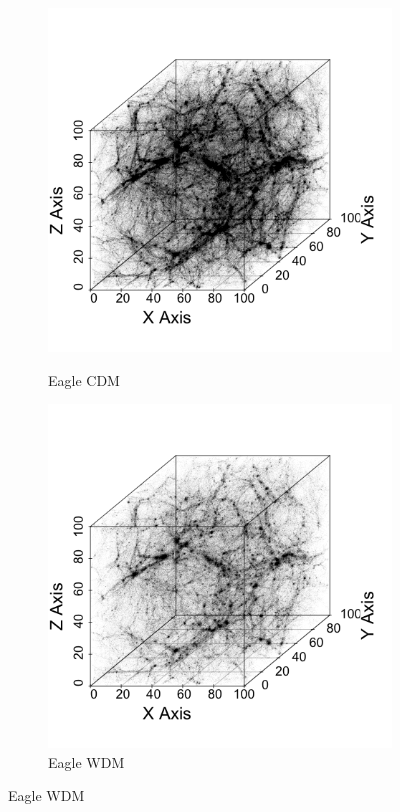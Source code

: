 \documentclass[12pt]{article}
\begin{document}
\begin{figure}[htp!]
  \centering
  \begin{subfigure}{0.24\textwidth}
    \caption{Eagle CDM}
    \includegraphics[width=\linewidth]{figure_11_cdm_plot.png}
    \label{fig:eagleDiagsA}
  \end{subfigure}
  \begin{subfigure}{0.24\textwidth}
    \caption{Eagle WDM}
    \includegraphics[width=\linewidth]{figure_11_wdm_plot.png}

\end{subfigure}
\end{figure}
\end{document}
